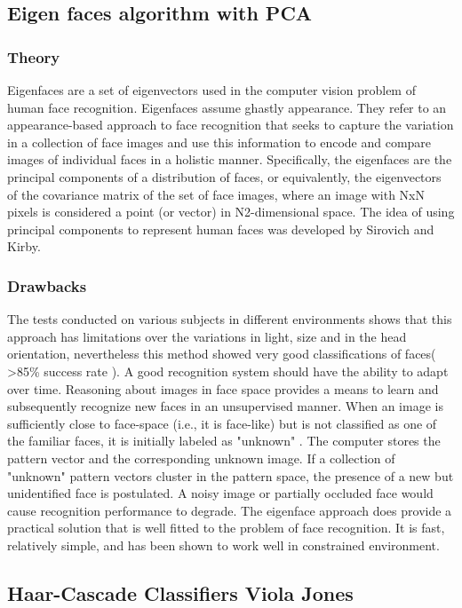 \documentclass[14.49pt, a4paper, one side, margin = 2in]{article}
\begin{document}
\subsection{Eigen faces algorithm with PCA}
\subsubsection{Theory}
Eigenfaces are a set of eigenvectors used in the computer vision problem of human face recognition. Eigenfaces assume ghastly appearance. They refer to an appearance-based approach to face recognition that seeks to capture the variation in a collection of face images and use this information to encode and compare images of individual faces in a holistic manner. Specifically, the eigenfaces are the principal components of a distribution of faces, or equivalently, the eigenvectors of the covariance matrix of the set of face images, where an image with NxN pixels is considered a point (or vector) in N2-dimensional space. The idea of using principal components to represent human faces was developed by Sirovich and Kirby\cite{sirovich1987low}.
\subsubsection{Drawbacks}
The tests conducted on various subjects in different environments shows
that this approach has limitations over the variations in light, size and in
the head orientation, nevertheless this method showed very good
classifications of faces( >85\% success rate ).
A good recognition system should have the ability to adapt over time.
Reasoning about images in face space provides a means to learn and
subsequently recognize new faces in an unsupervised manner. When an
image is sufficiently close to face-space (i.e., it is face-like) but is not
classified as one of the familiar faces, it is initially labeled as "unknown" .
The computer stores the pattern vector and the corresponding unknown
image. If a collection of "unknown" pattern vectors cluster in the pattern
space, the presence of a new but unidentified face is postulated. A noisy
image or partially occluded face would cause recognition performance to
degrade. The eigenface approach does provide a practical solution that is
well fitted to the problem of face recognition. It is fast, relatively simple,
and has been shown to work well in constrained environment\cite{lata2009facial}.
\subsection{Haar-Cascade Classifiers Viola Jones}
\end{document}
